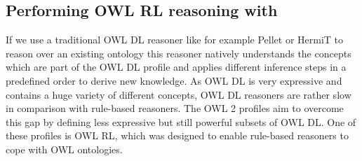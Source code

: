 \subsection{Performing OWL RL reasoning with \nthree}\label{owlrln3}
If we use a traditional OWL DL reasoner like for example Pellet \cite{Pellet} or HermiT \cite{hermit} to reason over an existing ontology 
this reasoner 
natively understands the concepts which are part of the OWL DL profile and applies 
different inference steps in a predefined order to derive new knowledge. %
%  
% 
% 
% 
% 
% 
As OWL DL is very expressive and contains a huge variety of different concepts, OWL DL reasoners are rather slow in comparison with rule-based reasoners. 
The OWL 2 profiles \cite{OWLRL} aim to overcome this gap 
by defining less expressive
but still powerful subsets of OWL DL. One of these profiles is OWL RL, which was designed to enable rule-based reasoners to cope with OWL ontologies. 

